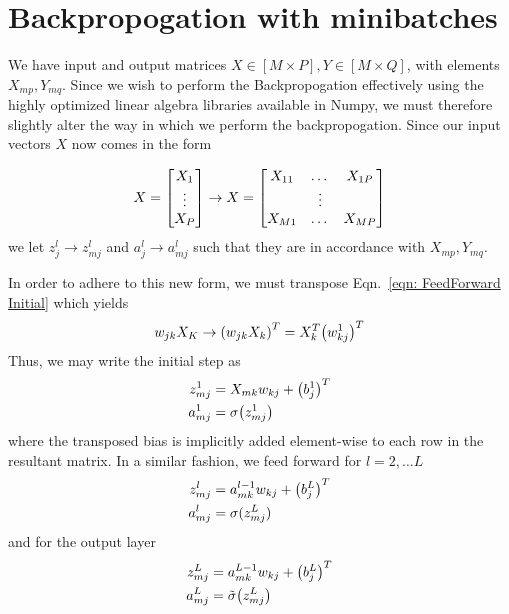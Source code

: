 \documentclass[reprint, english, nofootinbib]{revtex4-2}
\begin{document}
\section*{Backpropogation with minibatches}
We have input and output matrices $X\in[M\times P], Y\in[M\times Q]$, with elements $X_{mp}, Y_{mq}$. Since we wish to perform the Backpropogation effectively using the highly optimized linear algebra libraries available in Numpy, we must therefore slightly alter the way in which we perform the backpropogation. Since our input vectors $X$ now comes in the form

\begin{equation}
    X = \qty[
    \begin{matrix}
        X_1 \\ \vdots \\ X_P
    \end{matrix}
    ] \rightarrow
    X = \qty[
    \begin{matrix}
        X_{11} & \dots & X_{1P} \\
                 & \vdots&          \\
        X_{M1} & \dots & X_{MP}
    \end{matrix}
    ]
\end{equation}
we let $z^l_j \rightarrow z^l_{mj}$ and $a^l_{j}\rightarrow a^l_{mj}$ such that they are in accordance with $X_{mp}, Y_{mq}$.

In order to adhere to this new form, we must transpose Eqn.~\ref{eqn: FeedForward Initial} which yields
\begin{equation}
    w_{jk}X_K \rightarrow \qty(w_{jk}X_k)^T = X_k^T \qty(w^1_{kj})^T
\end{equation}
Thus, we may write the initial step as
\begin{align}
    \begin{split}
        z^1_{mj} &= X_{mk}w_{kj} + \qty(b^1_j)^T \\
        a^1_{mj} &= \sigma\qty(z^1_{mj})
    \end{split}
\end{align}
where the transposed bias is implicitly added element-wise to each row in the resultant matrix. In a similar fashion, we feed forward for $l = 2, \dots L$
\begin{align}
    \begin{split}
        z^l_{mj} &= a^{l-1}_{mk}w_{kj} + \qty(b^L_j)^T \\
        a^l_{mj} &= \sigma(z^L_{mj})
    \end{split}
\end{align}
and for the output layer
\begin{align}
    \begin{split}
        z^L_{mj} &= a^{L-1}_{mk}w_{kj} + \qty(b^L_j)^T \\
        a^L_{mj} &= \tilde\sigma\qty(z^L_{mj})
    \end{split}
\end{align}
\end{document}
